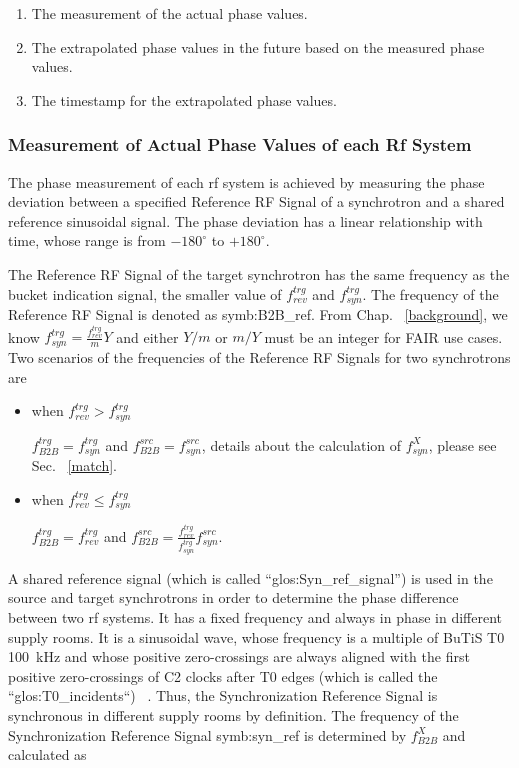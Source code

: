 \begin{enumerate}
\item The measurement of the actual phase values.
\item The extrapolated phase values in the future based on the measured phase values.
\item The timestamp for the extrapolated phase values.
\end{enumerate}
 \subsubsection{Measurement of Actual Phase Values of each Rf System}
The phase measurement of each rf system is achieved by measuring the phase deviation between a specified Reference RF Signal of a synchrotron and a shared reference sinusoidal signal. The phase deviation has a linear relationship with time, whose range is from $-180^\circ$ to $+180^\circ$. 


The Reference RF Signal of the target synchrotron has the same frequency as the bucket indication signal, the smaller value of $f_{\mathit{rev}}^{trg}$ and $f_{\mathit{syn}}^{trg}$. The frequency of the Reference RF Signal is denoted as \gls{symb:B2B_ref}. From Chap. ~\ref{background}, we know $f_{\mathit{syn}}^{trg}=\frac{f_{\mathit{rev}}^{trg}}{m}Y$ and either $Y/m$ or $m/Y$ must be an integer for FAIR use cases. Two scenarios of the frequencies of the Reference RF Signals for two synchrotrons are

\begin{itemize}
\item when $f_{\mathit{rev}}^{trg}>f_{\mathit{syn}}^{trg}$

$f_{\mathit{B2B}}^{trg}=f_{\mathit{syn}}^{trg}$ and $f_{\mathit{B2B}}^{src}=f_{\mathit{syn}}^{src}$, details about the calculation of $f_{\mathit{syn}}^{X}$, please see Sec. ~\ref{match}. 

\item when $f_{\mathit{rev}}^{trg}\le f_{\mathit{syn}}^{trg}$

$f_{\mathit{B2B}}^{trg}=f_{\mathit{rev}}^{trg}$ and $f_{\mathit{B2B}}^{src}=\frac{f_{\mathit{rev}}^{trg}}{f_{\mathit{syn}}^{trg}}f_{\mathit{syn}}^{src}$.
\end{itemize}

A shared reference signal (which is called “\gls{glos:Syn_ref_signal}”) is used in the source and target synchrotrons in order to determine the phase difference between two rf systems. It has a fixed frequency and always in phase in different supply rooms. It is a sinusoidal wave, whose frequency is a multiple of BuTiS T0 \SI{100}{kHz} and whose positive zero-crossings are always aligned with the first positive zero-crossings of C2 clocks after T0 edges (which is called the ``\gls{glos:T0_incidents}``) ~\cite{ferrand_system_2014, ferrand_system_2015}. Thus, the Synchronization Reference Signal is synchronous in different supply rooms by definition. The frequency of the Synchronization Reference Signal \gls{symb:syn_ref} is determined by $f_{\mathit{B2B}}^{X}$ and calculated as

